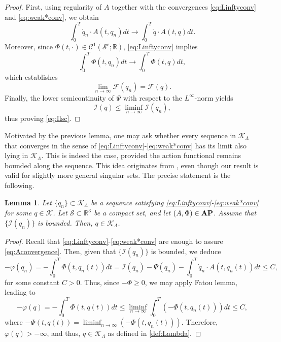 \documentclass{article}
\newcommand{\boK}{\mathcal{K}}
\newcommand{\boI}{\mathcal{I}}
\newcommand{\R}{\mathbb{R}}
\newcommand{\boF}{\mathcal{F}}
\newcommand{\boS}{\mathcal{S}}
\newcommand{\dq}{\dot{q}}
\newcommand{\AP}{\textnormal{\textbf{AP}}}
\newtheorem{lemma}{Lemma}[section]
\theoremstyle{definition}
\begin{document}
\begin{proof}
    First, using regularity of $A$ together with the convergences \eqref{eq:Linftyconv} and \eqref{eq:weak*conv}, we obtain
    \begin{equation}\label{eq:Aconvergence}
        \int_0^T \dot{q}_n\cdot A(t,q_n)dt\to \int_0^T \dot{q}\cdot A(t,q)dt.
    \end{equation}
    Moreover, since $\Phi(t,\cdot)\in\mathcal{C}^1(\boS^c;\R)$, \eqref{eq:Linftyconv} implies
    \[\int_0^T\Phi(t,q_n)dt\to \int_0^T\Phi(t,q)dt,\]
    which establishes
    \begin{equation*}
    	\lim_{n\to\infty}\boF(q_n)=\boF(q).
    \end{equation*}
    Finally, the lower semicontinuity of $\Psi$ with respect to the $L^\infty$-norm yields
    \[\boI(q)\leq\liminf_{n\to\infty}\boI(q_n),\] thus proving \eqref{eq:Ilsc}.
\end{proof}

Motivated by the previous lemma, one may ask whether every sequence in $\boK_\Lambda$ that converges in the sense of \eqref{eq:Linftyconv}-\eqref{eq:weak*conv} has its limit also lying in $\boK_\Lambda$. This is indeed the case, provided the action functional remains bounded along the sequence. This idea originates from \cite[Lemma 3.2]{AS}, even though our result is valid for slightly more general singular sets. The precise statement is the following.


\begin{lemma}\label{lemma:KLambdaclosed}
    Let $\{q_n\}\subset \boK_\Lambda$ be a sequence satisfying \eqref{eq:Linftyconv}-\eqref{eq:weak*conv} for some $q\in\boK$. Let $\boS\subset\R^3$ be a compact set, and let $(A,\Phi)\in\AP$. Assume that $\{\boI(q_n)\}$ is bounded. Then, $q\in\boK_\Lambda$.
\end{lemma}	

\begin{proof}
    Recall that \eqref{eq:Linftyconv}-\eqref{eq:weak*conv} are enough to assure \eqref{eq:Aconvergence}. Then, given that $\{\boI(q_n)\}$ is bounded, we deduce
		\[-\varphi(q_n)=-\int_0^T\Phi(t,q_n(t))dt=\boI(q_n)-\Psi(q_n)-\int_0^T \dq_n\cdot A(t,q_n(t))dt\leq C,\]
    for some constant $C>0$. Thus, since $-\Phi\geq 0$, we may apply Fatou lemma, leading to
		\[-\varphi(q)=-\int_0^T\Phi(t,q(t))dt\leq\liminf_{n\to\infty}\int_0^T(-\Phi(t,q_n(t)))dt\leq C,\]
		where $-\Phi(t,q(t))=\liminf_{n\to\infty}(-\Phi(t,q_n(t)))$. Therefore, $\varphi(q)>-\infty$, and thus,  $q\in\boK_\Lambda$ as defined in \eqref{def:Lambda}.
\end{proof}
\end{document}
